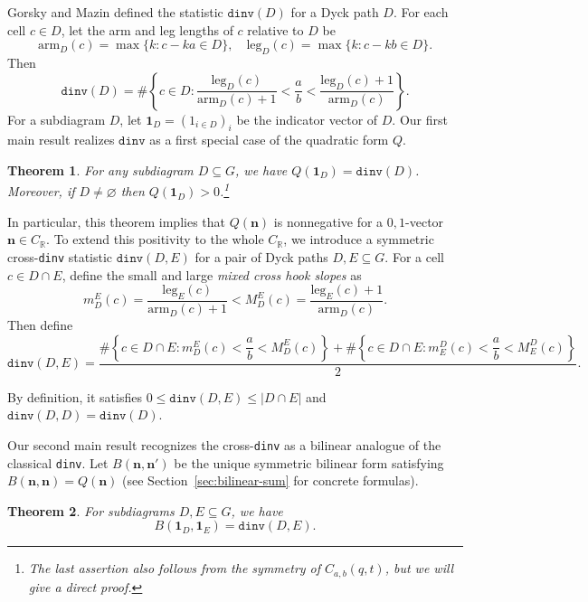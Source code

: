 \documentclass[11pt,reqno]{amsart}
\newtheorem{theorem}{Theorem}[section]
\theoremstyle{remark}
\begin{document}
Gorsky and Mazin defined the statistic $\mathtt{dinv}(D)$ for a Dyck path $D$. For each cell $c\in D$, let the arm and leg lengths of $c$ relative to $D$ be
\[ \mathrm{arm}_D(c)=\max\{k : c - ka \in D\}, \quad \mathrm{leg}_D(c)=\max\{k : c - kb \in D\}.\]
Then
\[
\mathtt{dinv}(D)=\#\left\{c\in D: \frac{\mathrm{leg}_D(c)}{\mathrm{arm}_D(c)+1} < \frac{a}{b} < \frac{\mathrm{leg}_D(c)+1}{\mathrm{arm}_D(c)}\right\}.
\]
For a subdiagram $D$, let $\mathbf{1}_D=(1_{i\in D})_i$ be the indicator vector of $D$. Our first main result realizes $\mathtt{dinv}$ as a first special case of the quadratic form $Q$.

\begin{theorem}\label{thm:dinv-match}
    For any subdiagram $D \subseteq G$, we have $Q(\mathbf{1}_D) = \mathtt{dinv}(D)$. Moreover, if $D\neq \varnothing$ then $Q(\mathbf{1}_D)>0$.\footnote{The last assertion also follows from the symmetry of $C_{a,b}(q,t)$, but we will give a direct proof.}
\end{theorem}

In particular, this theorem implies that $Q(\mathbf{n})$ is nonnegative for a $0,1$-vector $\mathbf{n}\in C_\mathbb{R}$. To extend this positivity to the whole $C_{\mathbb{R}}$, we introduce a symmetric cross-\texttt{dinv} statistic $\mathtt{dinv}(D,E)$ for a pair of Dyck paths $D,E\subseteq G$. For a cell $c\in D\cap E$, define the small and large \emph{mixed cross hook slopes} as
\[ m_{D}^{E}(c)=\frac{\mathrm{leg}_{E}(c)}{\mathrm{arm}_{D}(c)+1} < M_{D}^{E}(c)=\frac{\mathrm{leg}_{E}(c)+1}{\mathrm{arm}_{D}(c)}.\]
Then define
\[ \mathtt{dinv}(D,E)=\frac{\#\left\{c\in D\cap E: m_D^E(c)<\dfrac{a}{b}<M_D^E(c)\right\}+\#\left\{c\in D\cap E: m_E^D(c)<\dfrac{a}{b}<M_E^D(c)\right\}}{2}.\]

By definition, it satisfies $0\leq \mathtt{dinv}(D,E)\leq |D\cap E|$ and $\mathtt{dinv}(D,D)=\mathtt{dinv}(D)$.

Our second main result recognizes the cross-\texttt{dinv} as a bilinear analogue of the classical \texttt{dinv}. Let $B(\mathbf{n},\mathbf{n'})$ be the unique symmetric bilinear form satisfying $B(\mathbf{n},\mathbf{n})=Q(\mathbf{n})$ (see Section~\ref{sec:bilinear-sum} for concrete formulas). 

\begin{theorem}\label{thm:bilinear-sum}
    For subdiagrams $D,E\subseteq G$, we have
    \[ B(\mathbf{1}_D,\mathbf{1}_E)=\mathtt{dinv}(D,E).\]
\end{theorem}
\end{document}
